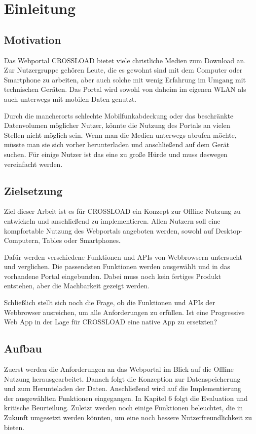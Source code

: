 \chapter{Einleitung}
\label{Kap1}

\section{Motivation}
Das Webportal CROSSLOAD bietet viele christliche Medien zum Download an. Zur Nutzergruppe gehören Leute, die es gewohnt sind mit dem Computer oder Smartphone zu arbeiten, aber auch solche mit wenig Erfahrung im Umgang mit technischen Geräten. Das Portal wird sowohl von daheim im eigenen WLAN als auch unterwegs mit mobilen Daten genutzt.

Durch die mancherorts schlechte Mobilfunkabdeckung oder das beschränkte
Datenvolumen möglicher Nutzer, könnte die Nutzung des Portals an vielen Stellen nicht
möglich sein. Wenn man die Medien unterwegs abrufen möchte, müsste man sie sich
vorher herunterladen und anschließend auf dem Gerät suchen. Für einige Nutzer ist das
eine zu große Hürde und muss deswegen vereinfacht werden. 

\section{Zielsetzung}
Ziel dieser Arbeit ist es für CROSSLOAD ein Konzept zur Offline Nutzung zu entwickeln und anschließend zu implementieren. Allen Nutzern soll eine kompfortable Nutzung des Webportals angeboten werden, sowohl auf Desktop-Computern, Tables oder Smartphones. 

Dafür werden verschiedene Funktionen und APIs von Webbrowsern untersucht und verglichen. Die passendsten Funktionen werden ausgewählt und in das vorhandene Portal eingebunden. Dabei muss noch kein fertiges Produkt entstehen, aber die Machbarkeit gezeigt werden. 

Schließlich stellt sich noch die Frage, ob die Funktionen und APIs der Webbrowser ausreichen, um alle Anforderungen zu erfüllen. Ist eine Progressive Web App in der Lage für CROSSLOAD eine native App zu ersetzten?

\section{Aufbau}
Zuerst werden die Anforderungen an das Webportal im Blick auf die Offline Nutzung herausgearbeitet. Danach folgt die Konzeption zur Datenspeicherung und zum Herunteladen der Daten. Anschließend wird auf die Implementierung der ausgewählten Funktionen eingegangen. In Kapitel 6 folgt die Evaluation und kritische Beurteilung. Zuletzt werden noch einige Funktionen beleuchtet, die in Zukunft umgesetzt werden könnten, um eine noch bessere Nutzerfreundlichkeit zu bieten.

